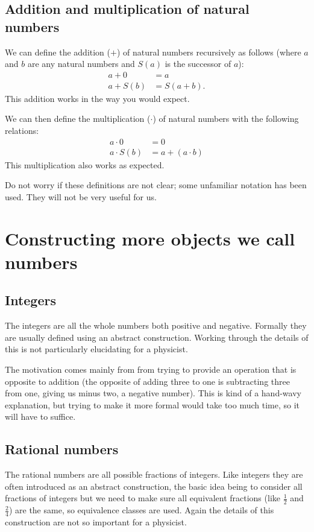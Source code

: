 \section{Addition and multiplication of natural numbers}
We can define the addition ($+$) of natural numbers recursively as follows (where $a$ and $b$ are any natural numbers and $S(a)$ is the successor of $a$):
\begin{align}
a + 0 &= a \\
a + S(b) &= S(a+b).
\end{align}
This addition works in the way you would expect. 

We can then define the multiplication ($\cdot$) of natural numbers with the following relations:
\begin{align}
a\cdot 0 &= 0 \\
a\cdot S(b) &= a + (a\cdot b)
\end{align}
This multiplication also works as expected.

Do not worry if these definitions are not clear; some unfamiliar notation has been used. They will not be very useful for us.



\chapter{Constructing more objects we call numbers}
\section{Integers}

The integers are all the whole numbers both positive and negative. Formally they are usually defined using an abstract construction. Working through the details of this is not particularly elucidating for a physicist.

The motivation comes mainly from from trying to provide an operation that is opposite to addition (the opposite of adding three to one is subtracting three from one, giving us minus two, a negative number). This is kind of a hand-wavy explanation, but trying to make it more formal would take too much time, so it will have to suffice.

\section{Rational numbers}
The rational numbers are all possible fractions of integers. Like integers they are often introduced as an abstract construction, the basic idea being to consider all fractions of integers but we need to make sure all equivalent fractions (like $\frac{1}{2}$ and $\frac{2}{4}$) are the same, so equivalence classes are used. Again the details of this construction are not so important for a physicist.

